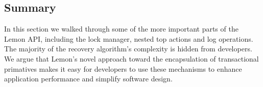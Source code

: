 \documentclass[10pt,letterpaper,twocolumn,english]{article}
\newcommand{\yad}{Lemon\xspace}
\newcommand{\eab}[1]{\textcolor{red}{\bf EAB: #1}}
\begin{document}




\subsection{Summary}

In this section we walked through some of the more important parts of
the \yad API, including the lock manager, nested top actions and log
operations.  The majority of the recovery algorithm's complexity is 
hidden from developers.  We argue that \yad's novel approach toward 
the encapsulation of transactional primatives makes it easy for 
developers to use these mechanisms to enhance application performance
and simplify software design.








\end{document}
